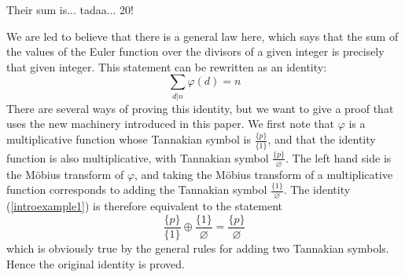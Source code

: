 \begin{example}
Their sum is... tadaa... 20!

We are led to believe that there is a general law here, which says that the sum of the values of the Euler function over the divisors of a given integer is precisely that given integer. This statement can be rewritten as an identity:
\begin{equation} \label{introexample1}
\sum_{d \vert n} \varphi(d) = n  
\end{equation}
There are several ways of proving this identity, but we want to give a proof that uses the new machinery introduced in this paper. We first note that $\varphi$ is a multiplicative function whose Tannakian symbol is $\frac{ \{ p  \} }{ \{  1 \}  }$, and that the identity function is also multiplicative, with Tannakian symbol $\frac{ \{ p  \} }{ \varnothing  }$. The left hand side is the M{\"o}bius transform of $\varphi$, and taking the M{\"o}bius transform of a multiplicative function corresponds to adding the Tannakian symbol $\frac{ \{ 1  \} }{ \varnothing } $. The identity (\ref{introexample1}) is therefore equivalent to the statement 
\begin{equation}
\frac{ \{ p  \} }{ \{  1 \}  } \oplus \frac{ \{ 1  \} }{ \varnothing  } = \frac{ \{ p  \} }{ \varnothing  }
\end{equation}
which is obviously true by the general rules for adding two Tannakian symbols. Hence the original identity is proved.
\end{example}


